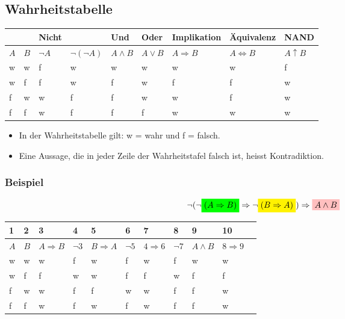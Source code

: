 \subsection{Wahrheitstabelle}
\begin{tabular}{|l|l||l|l|l|l|l|l|l|}
  \hline
  & & Nicht &  & Und & Oder & Implikation & Äquivalenz & NAND \\
  \hline
  $A$ & $B$ & $\neg A$ & $\neg (\neg A)$ & $A \wedge B$ & $A \vee B$ & $A \Rightarrow B$ & $A \Leftrightarrow B$ & $A \uparrow B$ \\
  \hline
  \hline
  w & w & f & w & w & w & w  & w  & f \\
  w & f & f & w & f & w & f  & f  & w \\
  f & w & w & f & f & w & w  & f  & w \\
  f & f & w & f & f & f & w  & w  & w \\
  \hline
\end{tabular}
\begin{itemize}
  \item In der Wahrheitstabelle gilt: w = wahr und f = falsch.
  \item Eine Aussage, die in jeder Zeile der Wahrheitstafel falsch ist, heisst Kontradiktion.
\end{itemize}

\subsubsection{Beispiel}
\[ \neg (\neg \colorbox{green}{$(A \Rightarrow B)$} \Rightarrow \neg \colorbox{yellow}{$(B \Rightarrow A)$}) \Rightarrow \colorbox{pink}{$A \wedge B$} \]
\begin{tabular}{|l|l||l|l|l|l|l|l|l|l|l}
  \hline
  1 & 2 & 3 & 4 & 5 & 6 & 7 & 8 & 9 & 10 \\
  \hline
  $A$ & $B$ & \cellcolor{green} $A \Rightarrow B$ & $\neg 3$ & \cellcolor{yellow} $B \Rightarrow A$ & $\neg 5$ & $4 \Rightarrow 6$ & $\neg 7$ & \cellcolor{pink} $A \wedge B$ & $8 \Rightarrow 9$\\
  \hline
  \hline
  w & w & w & f & w & f & w & f & w & w \\
  w & f & f & w & w & f & f & w & f & f \\
  f & w & w & f & f & w & w & f & f & w \\
  f & f & w & f & w & f & w & f & f & w \\
  \hline
\end{tabular}

